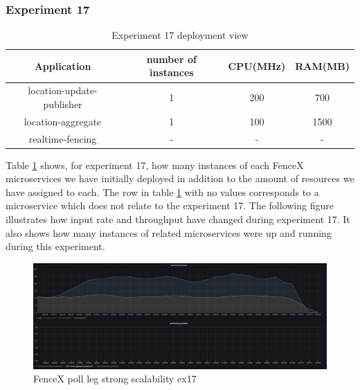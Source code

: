 \documentclass[a4]{report}
\begin{document}
    \subsubsection{Experiment 17}
    \begin{table}[h!]
        \centering
        \begin{tabular}{|c|c|c|c|}
            \hline
            Application               & number of instances & CPU(MHz) & RAM(MB) \\
            \hline
            location-update-publisher & 1                   & 200      & 700     \\
            location-aggregate        & 1                   & 100      & 1500    \\
            realtime-fencing          & -                   & -        & -       \\
            \hline
        \end{tabular}
        \caption{Experiment 17 deployment view}
        \label{table:ex17-dv}
    \end{table}

    Table \ref{table:ex17-dv} shows, for experiment 17, how many instances of each FenceX microservices we have
    initially deployed in addition to the amount of resources we have assigned to each.
    The row in table \ref{table:ex17-dv} with no values corresponds to a microservice which does not relate to the
    experiment 17.
    The following figure illustrates how input rate and throughput have changed during experiment 17.
    It also shows how many instances of related microservices were up and running during this experiment.

    \begin{figure}[h!]
        \centering
        \caption{FenceX poll leg strong scalability ex17}
        \label{fig:ex17}
        \includegraphics[width=\linewidth, scale=2]{images/evaluation/ex17-benchmarking-ongoing-2per4sec.png}
    \end{figure}

    \clearpage
\end{document}
